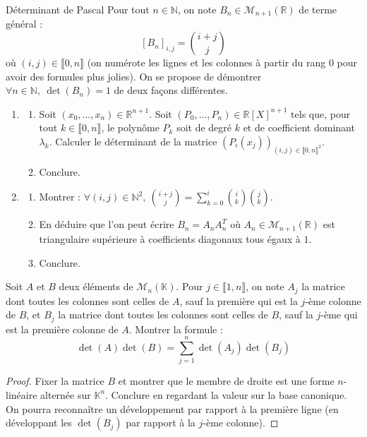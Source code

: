 \documentclass[french,a4paper]{article}
\newcommand{\N}{\mathbb{N}}
\newcommand{\R}{\mathbb{R}}
\newcommand{\K}{\mathbb{K}}
\theoremstyle{plain}
\theoremstyle{definition}
\theoremstyle{remark}
\begin{document}
\begin{ex}[Châteaux]{Déterminant de Pascal}
	Pour tout $n\in\N$, on note $B_n\in\mathcal{M}_{n+1}(\R)$ de terme général : $$[B_n]_{i,j}=\binom{i+j}{j}$$ où $(i,j)\in\llbracket0,n\rrbracket$ (on numérote les lignes et les colonnes à partir du rang $0$ pour avoir des formules plus jolies). On se propose de démontrer $\forall n\in\N,\ \det(B_n)=1$ de deux façons différentes.
	\begin{enumerate}
		\item \begin{enumerate}[label=\alph*.]
			\item Soit $(x_0,\ldots,x_n)\in\R^{n+1}$. Soit $(P_0,\ldots,P_n)\in\R[X]^{n+1}$ tels que, pour tout $k\in\llbracket0,n\rrbracket$, le polynôme $P_k$ soit de degré $k$ et de coefficient dominant $\lambda_k$. Calculer le déterminant de la matrice $\left(P_i(x_j)\right)_{(i,j)\in\llbracket0,n\rrbracket^2}$.
			\item Conclure. 
		\end{enumerate}
		\item \begin{enumerate}[label=\alph*.]
			\item Montrer : $\displaystyle\forall(i,j)\in\N^2,\ \binom{i+j}{j}=\sum_{k=0}^{i}\binom{i}{k}\binom{j}{k}$.
			\item En déduire que l'on peut écrire $B_n=A_nA_n^T$ où $A_n\in\mathcal{M}_{n+1}(\R)$ est triangulaire supérieure à coefficients diagonaux tous égaux à $1$.
			\item Conclure.
		\end{enumerate}
	\end{enumerate}
\end{ex}

\begin{ex}[]{}
	Soit $A$ et $B$ deux éléments de $\mathcal{M}_n(\K)$. Pour $j\in\llbracket1,n\rrbracket$, on note $A_j$ la matrice dont toutes les colonnes sont celles de $A$, sauf la première qui est la $j$-ème colonne de $B$, et $B_j$ la matrice dont toutes les colonnes sont celles de $B$, sauf la $j$-ème qui est la première colonne de $A$. Montrer la formule : $$\det(A)\det(B)=\sum_{j=1}^{n}\det(A_j)\det(B_j)$$
\end{ex}
\begin{proof}
	Fixer la matrice $B$ et montrer que le membre de droite est une forme $n$-linéaire alternée sur $\K^n$. Conclure en regardant la valeur sur la base canonique. On pourra reconnaître un développement par rapport à la première ligne (en développant les $\det(B_j)$ par rapport à la $j$-ème colonne).
\end{proof}
\end{document}

